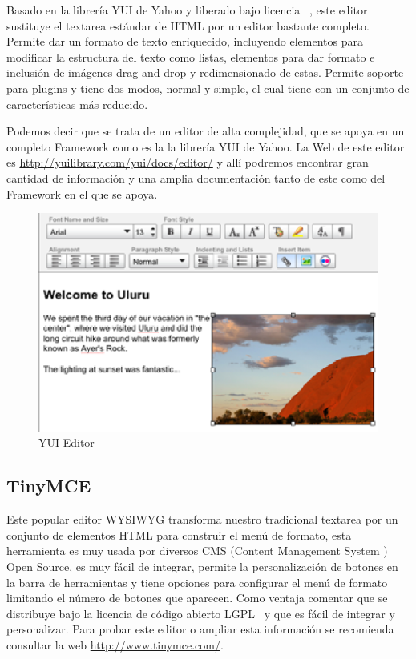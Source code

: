 Basado en la librería YUI de Yahoo y liberado bajo licencia ~\cite{BSD:bsd}, este editor sustituye el textarea estándar de HTML por un editor bastante completo. Permite dar un formato de texto enriquecido, incluyendo elementos para modificar la estructura del texto como listas, elementos para dar formato e inclusión de imágenes drag-and-drop y redimensionado de estas. Permite soporte para plugins y tiene dos modos, normal y simple, el cual tiene con un conjunto de características más reducido.

Podemos decir que se trata de un editor de alta complejidad, que se apoya en un completo Framework como es la la librería YUI de Yahoo. La Web de este editor es \url{http://yuilibrary.com/yui/docs/editor/} y allí podremos encontrar gran cantidad de información y una amplia documentación tanto de este como del Framework en el que se apoya. 

\begin{figure}[h!]
  \centering
      \includegraphics[width=1.0\textwidth]{fig/yuie1}
  \caption{YUI Editor}
\end{figure}

\subsection{TinyMCE}

 Este popular editor WYSIWYG transforma nuestro tradicional textarea por un conjunto de elementos HTML para construir el menú de formato, esta herramienta es muy usada por diversos CMS (Content Management System ) Open Source, es muy fácil de integrar, permite la personalización de botones en la barra de herramientas y tiene opciones para configurar el menú de formato limitando el número de botones que aparecen. Como ventaja comentar que se distribuye bajo la licencia de código abierto LGPL~\cite{LGPL:lgpl} y que es fácil de integrar y personalizar. Para probar este editor o ampliar esta información se recomienda consultar la web \url{http://www.tinymce.com/}.

